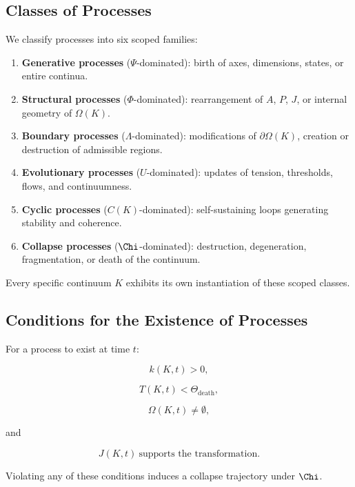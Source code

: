 \subsection{Classes of Processes}

We classify processes into six scoped families:

\begin{enumerate}
    \item \textbf{Generative processes} ($\Psi$-dominated):  
    birth of axes, dimensions, states, or entire continua.
    
    \item \textbf{Structural processes} ($\Phi$-dominated):  
    rearrangement of $A$, $P$, $J$, or internal geometry of $\Omega(K)$.

    \item \textbf{Boundary processes} ($\Lambda$-dominated):  
    modifications of $\partial\Omega(K)$, creation or destruction of
    admissible regions.

    \item \textbf{Evolutionary processes} ($U$-dominated):  
    updates of tension, thresholds, flows, and continuumness.

    \item \textbf{Cyclic processes} ($C(K)$-dominated):  
    self-sustaining loops generating stability and coherence.

    \item \textbf{Collapse processes} ($\Chi$-dominated):  
    destruction, degeneration, fragmentation, or death of the continuum.
\end{enumerate}

Every specific continuum $K$ exhibits its own instantiation of these
scoped classes.

\subsection{Conditions for the Existence of Processes}

For a process to exist at time $t$:

\[
k(K,t) > 0,
\]

\[
T(K,t) < \Theta_{\mathrm{death}},
\]

\[
\Omega(K,t) \neq \emptyset,
\]

and

\[
J(K,t) \ \text{supports the transformation}.
\]

Violating any of these conditions induces a collapse trajectory under $\Chi$.

